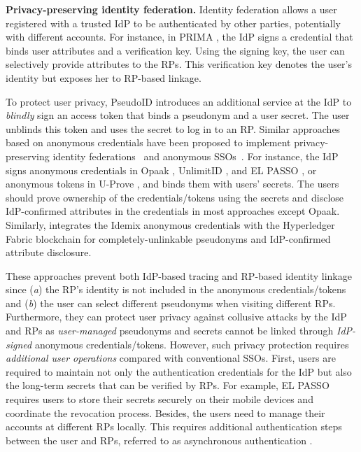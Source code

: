 \noindent\textbf{Privacy-preserving identity federation.} Identity federation allows a user registered with a trusted IdP to be authenticated by other parties, potentially with different accounts. For instance, in PRIMA \cite{prima}, the IdP signs a credential 
that binds user attributes and a verification key. Using the signing key, the user can selectively provide attributes to the RPs. %
This verification key denotes the user's identity but exposes her to RP-based linkage. 

To protect user privacy, PseudoID \cite{PseudoID} introduces an additional service at the IdP to \emph{blindly} sign %
an access token that binds a pseudonym and a user secret. The user unblinds this token and uses the secret to log in to an RP. Similar approaches based on anonymous credentials \cite{anon-credential-2001, idemix, anon-credential} have been proposed to implement privacy-preserving identity federations~\cite{PseudoID, hyperledge-idemix, Opaak, uprov, UnlimitID} and anonymous SSOs~\cite{ELPASSO}. For instance, the IdP signs anonymous credentials in Opaak \cite{Opaak}, UnlimitID \cite{UnlimitID}, and EL PASSO \cite{ELPASSO}, or anonymous tokens in U-Prove \cite{uprov,uprove-conference}, and binds them with users' secrets. %
The users should prove ownership of the credentials/tokens using the secrets and disclose IdP-confirmed attributes in the credentials in most approaches except Opaak. Similarly, \cite{hyperledge-idemix} integrates the Idemix anonymous credentials \cite{idemix} with the Hyperledger Fabric blockchain for completely-unlinkable pseudonyms and IdP-confirmed attribute disclosure.

These approaches prevent both IdP-based tracing and RP-based identity linkage since (\emph{a}) the RP's identity is not included in the anonymous credentials/tokens and (\emph{b}) the user can select different pseudonyms when visiting different RPs. Furthermore, they can protect user privacy against collusive attacks by the IdP and RPs as \emph{user-managed} pseudonyms and secrets cannot be linked through \emph{IdP-signed} anonymous credentials/tokens. 
However, such privacy protection requires \emph{additional user operations} compared with conventional SSOs. First, users are required to maintain not only the authentication credentials for the IdP but also the long-term secrets that can be verified by RPs. For example, EL PASSO \cite{ELPASSO} requires users to store their secrets securely on their mobile devices and coordinate the revocation process. Besides, the users need to manage their accounts at different RPs locally. This requires additional authentication steps between the user and RPs, referred to as asynchronous authentication \cite{ELPASSO}.

